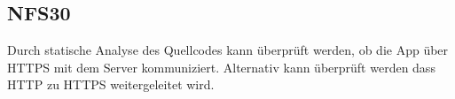 \subsection*{NFS30}
Durch \gls{statische Analyse} des \Gls{Quellcode}s kann überprüft werden, ob die App über \Gls{HTTPS} mit dem \Gls{Server} kommuniziert.
Alternativ kann überprüft werden dass \Gls{HTTP} zu \Gls{HTTPS} weitergeleitet wird.